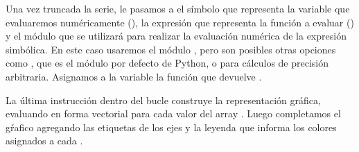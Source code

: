     Una vez truncada la serie, le pasamos a  el símbolo que representa la variable que evaluaremos numéricamente (), la expresión que representa la función a evaluar () y el módulo que se utilizará para realizar la evaluación numérica de la expresión simbólica. En este caso usaremos el módulo , pero son posibles otras opciones como , que es el módulo por defecto de Python, o  para cálculos de precisión arbitraria. Asignamos a la variable  la función que devuelve .

    La última instrucción dentro del bucle construye la representación gráfica, evaluando en forma vectorial  para cada valor del array . Luego completamos el gŕafico agregando las etiquetas de los ejes y la leyenda que informa los colores asignados a cada .

